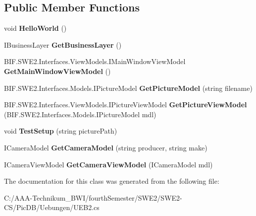 \subsection*{Public Member Functions}
\begin{DoxyCompactItemize}
\item 
\mbox{\label{class_pic_d_b_1_1_uebungen_1_1_u_e_b2_a8d5b9d8ccdf8e62fe2ec1ff860c3248d}} 
void {\bfseries Hello\+World} ()
\item 
\mbox{\label{class_pic_d_b_1_1_uebungen_1_1_u_e_b2_a93d810ef8a680dd1b112306cdd1eb3b7}} 
I\+Business\+Layer {\bfseries Get\+Business\+Layer} ()
\item 
\mbox{\label{class_pic_d_b_1_1_uebungen_1_1_u_e_b2_a5ba6e0701ae149ee5167049b5331079d}} 
B\+I\+F.\+S\+W\+E2.\+Interfaces.\+View\+Models.\+I\+Main\+Window\+View\+Model {\bfseries Get\+Main\+Window\+View\+Model} ()
\item 
\mbox{\label{class_pic_d_b_1_1_uebungen_1_1_u_e_b2_af42a6b204020ed0b829bea5156740b1b}} 
B\+I\+F.\+S\+W\+E2.\+Interfaces.\+Models.\+I\+Picture\+Model {\bfseries Get\+Picture\+Model} (string filename)
\item 
\mbox{\label{class_pic_d_b_1_1_uebungen_1_1_u_e_b2_ad32bc53be5b805a360389a78da4e916b}} 
B\+I\+F.\+S\+W\+E2.\+Interfaces.\+View\+Models.\+I\+Picture\+View\+Model {\bfseries Get\+Picture\+View\+Model} (B\+I\+F.\+S\+W\+E2.\+Interfaces.\+Models.\+I\+Picture\+Model mdl)
\item 
\mbox{\label{class_pic_d_b_1_1_uebungen_1_1_u_e_b2_a515cc0cacdca52659740afd1d31ec97e}} 
void {\bfseries Test\+Setup} (string picture\+Path)
\item 
\mbox{\label{class_pic_d_b_1_1_uebungen_1_1_u_e_b2_a6d7921a4addcded9c95ef87f32fbcf39}} 
I\+Camera\+Model {\bfseries Get\+Camera\+Model} (string producer, string make)
\item 
\mbox{\label{class_pic_d_b_1_1_uebungen_1_1_u_e_b2_a138207dd8e5d31f32257dee101da58fa}} 
I\+Camera\+View\+Model {\bfseries Get\+Camera\+View\+Model} (I\+Camera\+Model mdl)
\end{DoxyCompactItemize}


The documentation for this class was generated from the following file\+:\begin{DoxyCompactItemize}
\item 
C\+:/\+A\+A\+A-\/\+Technikum\+\_\+\+B\+W\+I/fourth\+Semester/\+S\+W\+E2/\+S\+W\+E2-\/\+C\+S/\+Pic\+D\+B/\+Uebungen/U\+E\+B2.\+cs\end{DoxyCompactItemize}
